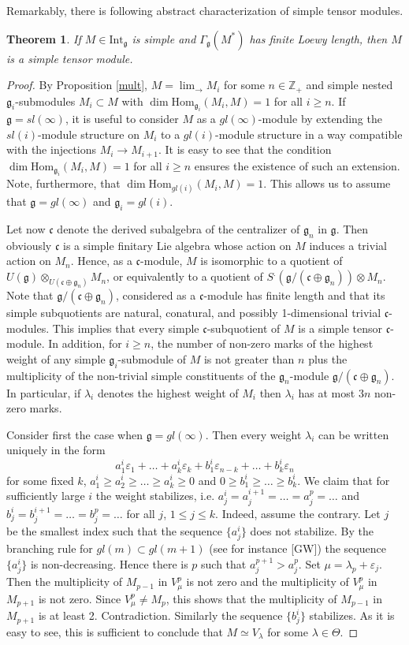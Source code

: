 \documentclass{birkmult}
\newcounter{theorem}
\newtheorem{theo}{Theorem}[section]
\newcommand{\cc}{\mathfrak{c}}
\renewcommand{\gg}{\mathfrak{g}}
\newcommand{\ds}{\displaystyle}
\newcommand{\Int}{\mathrm{Int}}
\renewcommand{\hom}{\mathrm{Hom}}
\begin{document}
Remarkably, there is following abstract characterization of simple tensor modules.
\begin{theo}\label{slind} If $M\in\Int_\gg$ is simple and
$\Gamma_{\gg}(M^*)$ has finite Loewy length, then $M$ is a simple tensor
module.
\end{theo}
\begin{proof} By Proposition \ref{mult}, $M=\ds\lim_{\to} M_i$ for some $n\in\mathbb{Z}_+$
and simple nested $\gg_i$-submodules $M_i\subset M$ with
$\dim\hom_{\gg_i}(M_i,M)=1$ for all $i\geq n$. If $\gg=sl(\infty)$, it
is useful to consider $M$ as a $gl(\infty)$-module by extending the 
$sl(i)$-module structure on $M_i$ to a $gl(i)$-module structure in a way
compatible with the injections $M_i \rightarrow M_{i+1}$. It is easy
to see that the condition $\dim\hom_{\gg_i}(M_i,M)=1$ for all $i\geq n$ 
ensures the existence of such an extension.  Note, furthermore, that 
$\dim\hom_{gl(i)}(M_i,M)=1$. This allows us to assume that 
$\gg=gl(\infty)$ and $\gg_i=gl(i)$. 

Let now
$\cc$ denote the derived subalgebra of the
centralizer of $\gg_n$  in $\gg$. Then obviously $\cc$ is a simple
finitary Lie algebra 
whose action on $M$ induces a trivial action on $M_n$.
Hence, as a $\cc$-module, $M$ is isomorphic to a
quotient of $U(\gg)\otimes_{U(\cc\oplus\gg_n)}M_n$, or 
equivalently to a quotient of $S^{.}(\gg/(\cc\oplus\gg_n))\otimes M_n$.
Note that $\gg/(\cc\oplus\gg_n)$, considered as a $\cc$-module has
finite length and that its simple subquotients are
natural, conatural, and
possibly 1-dimensional trivial $\cc$-modules. 
This implies that every
simple $\cc$-subquotient of $M$ is a simple tensor $\cc$-module. In addition, for $i\geq n$,
the number of non-zero marks of the highest weight of any simple $\gg_i$-submodule of $M$
is not greater than $n$ plus the multiplicity of the non-trivial simple constituents of the 
$\gg_n$-module $\gg/(\cc\oplus\gg_n)$. In particular, if
$\lambda_i$ denotes the highest weight of $M_i$ then $\lambda_i$ has
at most $3n$ non-zero marks.

Consider first the case when $\gg=gl(\infty)$. Then every weight $\lambda_i$ can be
written uniquely in the form 
$$a^i_1\varepsilon_1+\dots+a^i_k\varepsilon_k+b^i_1\varepsilon_{n-k}+\dots+b^i_k
\varepsilon_n$$
for some fixed $k$, $a^i_1\geq a^i_2\geq\dots \geq a^i_k\geq 0$ and $0\geq
b^i_1\geq\dots\geq b^i_k$. 
We claim that for sufficiently large $i$ the
weight stabilizes, i.e. $a^i_j=a^{i+1}_j=\dots=a^p_j=\dots$ and
$b^i_j=b^{i+1}_j=\dots=b^p_j=\dots$ for all $j$, $1\leq j \leq k$.
Indeed, assume the contrary. Let $j$ be the
smallest index such that the sequence $\{a^i_j\}$ does not
stabilize. By the branching rule for $gl(m)\subset gl(m+1)$ (see for instance [GW]) the
sequence $\{a^i_j\}$ is non-decreasing. Hence there is $p$ such that
$a^{p+1}_j>a^p_j$. Set $\mu=\lambda_{p}+\varepsilon_j$. Then the
multiplicity of $M_{p-1}$ in $V_\mu^p$ is not zero and the multiplicity of $V_\mu^p$
in $M_{p+1}$ is not zero. Since $V_\mu^p\not=M_p$, this shows that the multiplicity of $M_{p-1}$ in
$M_{p+1}$ is at least 2. Contradiction. Similarly the sequence $\{b^i_j\}$
stabilizes. As it is easy to see, this is sufficient to conclude that $M\simeq V_\lambda$ for some $\lambda\in\Theta$.


\end{proof}
\end{document}
